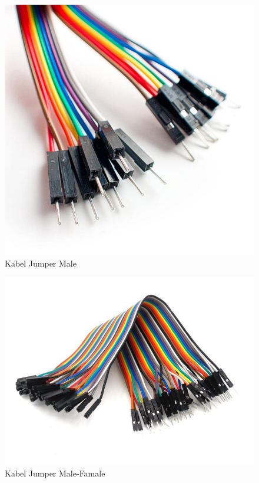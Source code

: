 \begin{enumerate}
\begin{figure}[H]
\centering
\includegraphics[width=1\textwidth]{figures/male.jpg}
\caption{Kabel Jumper Male}
\label{print}
\end{figure}

\begin{figure}[H]
\centering
\includegraphics[width=1\textwidth]{figures/malefamale.jpg}
\caption{Kabel Jumper Male-Famale}
\label{print}
\end{figure}


\end{enumerate}
